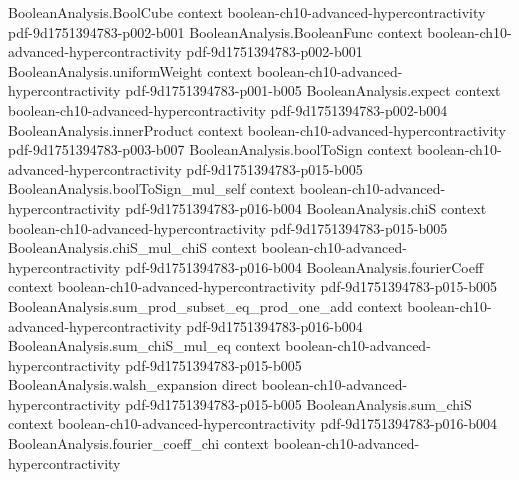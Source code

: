 \begin{theorem}
\label{BooleanAnalysis.Hypercontractivity.general_one_function_hypercontractivity}
\leanok
{}
\proofstep
  {BooleanAnalysis.BoolCube}
  {context}
  {boolean-ch10-advanced-hypercontractivity}
  {pdf-9d1751394783-p002-b001}
\proofstep
  {BooleanAnalysis.BooleanFunc}
  {context}
  {boolean-ch10-advanced-hypercontractivity}
  {pdf-9d1751394783-p002-b001}
\proofstep
  {BooleanAnalysis.uniformWeight}
  {context}
  {boolean-ch10-advanced-hypercontractivity}
  {pdf-9d1751394783-p001-b005}
\proofstep
  {BooleanAnalysis.expect}
  {context}
  {boolean-ch10-advanced-hypercontractivity}
  {pdf-9d1751394783-p002-b004}
\proofstep
  {BooleanAnalysis.innerProduct}
  {context}
  {boolean-ch10-advanced-hypercontractivity}
  {pdf-9d1751394783-p003-b007}
\proofstep
  {BooleanAnalysis.boolToSign}
  {context}
  {boolean-ch10-advanced-hypercontractivity}
  {pdf-9d1751394783-p015-b005}
\proofstep
  {BooleanAnalysis.boolToSign_mul_self}
  {context}
  {boolean-ch10-advanced-hypercontractivity}
  {pdf-9d1751394783-p016-b004}
\proofstep
  {BooleanAnalysis.chiS}
  {context}
  {boolean-ch10-advanced-hypercontractivity}
  {pdf-9d1751394783-p015-b005}
\proofstep
  {BooleanAnalysis.chiS_mul_chiS}
  {context}
  {boolean-ch10-advanced-hypercontractivity}
  {pdf-9d1751394783-p016-b004}
\proofstep
  {BooleanAnalysis.fourierCoeff}
  {context}
  {boolean-ch10-advanced-hypercontractivity}
  {pdf-9d1751394783-p015-b005}
\proofstep
  {BooleanAnalysis.sum_prod_subset_eq_prod_one_add}
  {context}
  {boolean-ch10-advanced-hypercontractivity}
  {pdf-9d1751394783-p016-b004}
\proofstep
  {BooleanAnalysis.sum_chiS_mul_eq}
  {context}
  {boolean-ch10-advanced-hypercontractivity}
  {pdf-9d1751394783-p015-b005}
\proofstep
  {BooleanAnalysis.walsh_expansion}
  {direct}
  {boolean-ch10-advanced-hypercontractivity}
  {pdf-9d1751394783-p015-b005}
\proofstep
  {BooleanAnalysis.sum_chiS}
  {context}
  {boolean-ch10-advanced-hypercontractivity}
  {pdf-9d1751394783-p016-b004}
\proofstep
  {BooleanAnalysis.fourier_coeff_chi}
  {context}
  {boolean-ch10-advanced-hypercontractivity}

\end{theorem}
